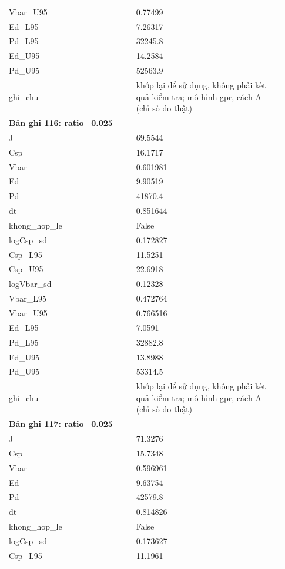 \begin{longtable}{p{0.43\linewidth}p{0.50\linewidth}}
Vbar\_\allowbreak U95 & 0.77499 \\
Ed\_\allowbreak L95 & 7.26317 \\
Pd\_\allowbreak L95 & 32245.8 \\
Ed\_\allowbreak U95 & 14.2584 \\
Pd\_\allowbreak U95 & 52563.9 \\
ghi\_\allowbreak chu & khớp lại để sử dụng, không phải kết quả kiểm tra; mô hình gpr, cách A (chỉ số đo thật) \\
\midrule
\multicolumn{2}{p{0.95\linewidth}}{\textbf{Bản ghi 116: ratio=0.025}} \\
J & 69.5544 \\
Csp & 16.1717 \\
Vbar & 0.601981 \\
Ed & 9.90519 \\
Pd & 41870.4 \\
dt & 0.851644 \\
khong\_\allowbreak hop\_\allowbreak le & False \\
logCsp\_\allowbreak sd & 0.172827 \\
Csp\_\allowbreak L95 & 11.5251 \\
Csp\_\allowbreak U95 & 22.6918 \\
logVbar\_\allowbreak sd & 0.12328 \\
Vbar\_\allowbreak L95 & 0.472764 \\
Vbar\_\allowbreak U95 & 0.766516 \\
Ed\_\allowbreak L95 & 7.0591 \\
Pd\_\allowbreak L95 & 32882.8 \\
Ed\_\allowbreak U95 & 13.8988 \\
Pd\_\allowbreak U95 & 53314.5 \\
ghi\_\allowbreak chu & khớp lại để sử dụng, không phải kết quả kiểm tra; mô hình gpr, cách A (chỉ số đo thật) \\
\midrule
\multicolumn{2}{p{0.95\linewidth}}{\textbf{Bản ghi 117: ratio=0.025}} \\
J & 71.3276 \\
Csp & 15.7348 \\
Vbar & 0.596961 \\
Ed & 9.63754 \\
Pd & 42579.8 \\
dt & 0.814826 \\
khong\_\allowbreak hop\_\allowbreak le & False \\
logCsp\_\allowbreak sd & 0.173627 \\
Csp\_\allowbreak L95 & 11.1961 \\

\end{longtable}
